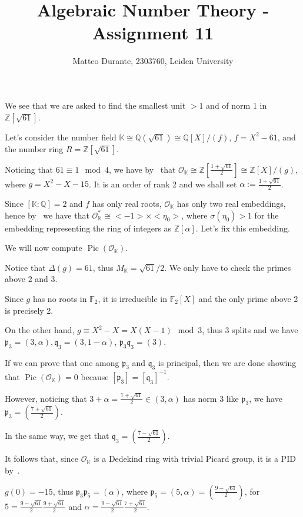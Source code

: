 \documentclass{article}
\newcommand{\numberset}{\mathbb}
\newcommand{\Z}{\numberset{Z}}
\newcommand{\Q}{\numberset{Q}}
\newcommand{\K}{\numberset{K}}
\newcommand{\F}{\numberset{F}}
\newcommand{\pid}{\mathfrak{p}}
\newcommand{\qid}{\mathfrak{q}}
\newcommand{\exercise}[1]{\noindent {\bf Exercise #1}}
\newcommand{\Pic}{\operatorname{Pic}}
\begin{document}
\title{Algebraic Number Theory - Assignment 11}

\author{Matteo Durante, 2303760, Leiden University}

\maketitle

\exercise{5}

We see that we are asked to find the smallest unit $>1$ and of norm 1 in $\Z[\sqrt{61}]$.

Let's consider the number field $\K\cong\Q(\sqrt{61})\cong\Q[X]/(f)$, $f=X^2-61$, and the number ring $R=\Z[\sqrt{61}]$.

Noticing that $61\equiv 1\mod 4$, we have by~\cite[thm. 3.10]{stev} that $\mathcal{O}_{\K}\cong\Z[\frac{1+\sqrt{61}}{2}]\cong\Z[X]/(g)$, where $g=X^2-X-15$. It is an order of rank 2 and we shall set $\alpha:=\frac{1+\sqrt{61}}{2}$.

Since $[\K:\Q]=2$ and $f$ has only real roots, $\mathcal{O}_{\K}$ has only two real embeddings, hence by~\cite[thm. 5.13]{stev} we have that $\mathcal{O}^*_{\K}\cong<-1>\times<\eta_0>$, where $\sigma(\eta_0)>1$ for the embedding representing the ring of integers as $\Z[\alpha]$. Let's fix this embedding.

We will now compute $\Pic(\mathcal{O}_{\K})$.

Notice that $\Delta(g)=61$, thus $M_{\K}=\sqrt{61}/2$. We only have to check the primes above 2 and 3.

Since $g$ has no roots in $\F_2$, it is irreducible in $\F_2[X]$ and the only prime above 2 is precisely 2.

On the other hand, $g\equiv X^2-X=X(X-1)\mod 3$, thus 3 splits and we have $\pid_3=(3,\alpha),\qid_3=(3,1-\alpha)$, $\pid_3\qid_3=(3)$.

If we can prove that one among $\pid_3$ and $\qid_3$ is principal, then we are done showing that $\Pic(\mathcal{O}_{\K})=0$ because $[\pid_3]=[\qid_3]^{-1}$.

However, noticing that $3+\alpha=\frac{7+\sqrt{61}}{2}\in(3,\alpha)$ has norm 3 like $\pid_3$, we have $\pid_3=(\frac{7+\sqrt{61}}{2})$.

In the same way, we get that $\qid_3=(\frac{7-\sqrt{61}}{2})$.

It follows that, since $\mathcal{O}_{\K}$ is a Dedekind ring with trivial Picard group, it is a PID by~\cite[ex. 2.39]{stev}.

$g(0)=-15$, thus $\pid_3\pid_5=(\alpha)$, where $\pid_5=(5,\alpha)=(\frac{9-\sqrt{61}}{2})$, for $5=\frac{9-\sqrt{61}}{2}\frac{9+\sqrt{61}}{2}$ and $\alpha=\frac{9-\sqrt{61}}{2}\frac{7+\sqrt{61}}{2}$.
\end{document}

